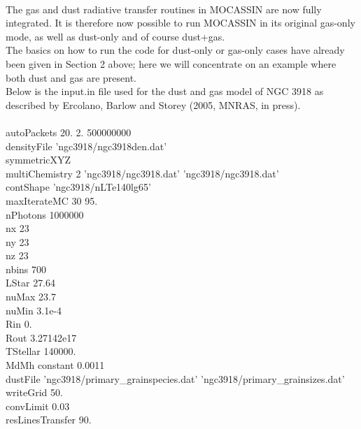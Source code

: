 \documentclass[11pt]{article}
\begin{document}
\\

   The gas and dust radiative transfer routines in MOCASSIN are now fully integrated.
   It is therefore now possible to run MOCASSIN in its original gas-only mode, as well 
   as dust-only and of course dust+gas. \\
   The basics on how to run the code for dust-only or gas-only cases have already been 
   given in Section 2 above; here we will concentrate on an example where both dust 
   and gas are present. \\
   Below is the input.in file used for the dust and gas model of NGC 3918 as described 
   by Ercolano, Barlow and Storey (2005, MNRAS, in press). \\
\\
\indent         autoPackets 20. 2. 500000000\\
\indent         densityFile 'ngc3918/ngc3918den.dat'\\
\indent         symmetricXYZ\\
\indent         multiChemistry 2 'ngc3918/ngc3918.dat' 'ngc3918/ngc3918.dat'\\
\indent         contShape 'ngc3918/nLTe140lg65'\\
\indent         maxIterateMC  30 95.\\
\indent         nPhotons 1000000\\
\indent         nx 23\\
\indent         ny 23\\
\indent         nz 23\\
\indent         nbins 700\\
\indent         LStar 27.64\\
\indent         nuMax 23.7\\
\indent         nuMin 3.1e-4\\
\indent         Rin 0.\\
\indent         Rout 3.27142e17\\
\indent         TStellar 140000.\\
\indent         MdMh constant 0.0011\\
\indent         dustFile 'ngc3918/primary\_grainspecies.dat' 'ngc3918/primary\_grainsizes.dat'\\
\indent         writeGrid 50.\\
\indent         convLimit 0.03\\
\indent         resLinesTransfer 90.\\
\end{document}
